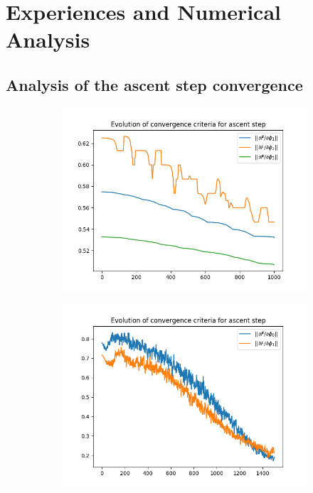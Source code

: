 \section{Experiences and Numerical Analysis}

\subsection{Analysis of the ascent step convergence}
\begin{figure}
    \begin{subfigure}{.5\textwidth}
        \centering
        \includegraphics[width=\textwidth]{figures/ascent_criteria_n_samples16000.png}
    \end{subfigure}
    \begin{subfigure}{.5\textwidth}
        \centering
        \includegraphics[width=\textwidth]{figures/ascent_criteria_msamples16000_iter0_1D_2skewnorm.png}
    \end{subfigure}
\end{figure}

